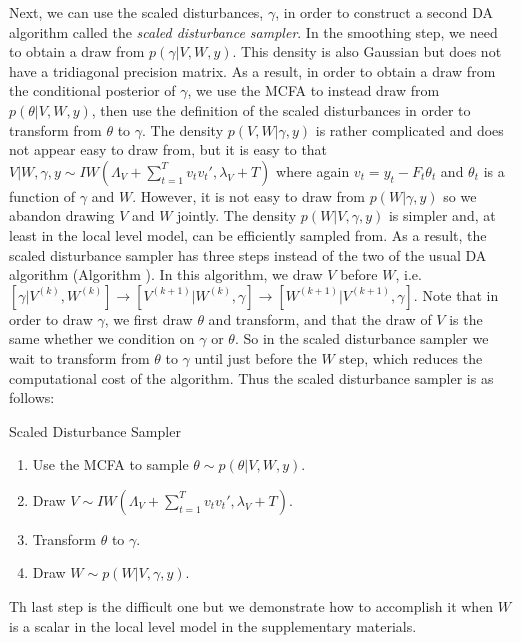 \documentclass{article}
\begin{document}
Next, we can use the scaled disturbances, $\gamma$, in order to construct a second DA algorithm called the {\it scaled disturbance sampler}. In the smoothing step, we need to obtain a draw from $p(\gamma|V,W,y)$. This density is also Gaussian but does not have a tridiagonal precision matrix. As a result, in order to obtain a draw from the conditional posterior of $\gamma$, we use the MCFA to instead draw from $p(\theta|V,W,y)$, then use the definition of the scaled disturbances in order to transform from $\theta$ to $\gamma$. The density $p(V,W|\gamma,y)$ is rather complicated and does not appear easy to draw from, but it is easy to that $V|W,\gamma,y \sim IW\left(\Lambda_V + \sum_{t=1}^Tv_tv_t',\lambda_V + T\right)$ where again $v_t = y_t - F_t\theta_t$ and $\theta_t$ is a function of $\gamma$ and $W$. However, it is not easy to draw from $p(W|\gamma,y)$ so we abandon drawing $V$ and $W$ jointly. The density $p(W|V,\gamma,y)$ is simpler and, at least in the local level model, can be efficiently sampled from. As a result, the scaled disturbance sampler has three steps instead of the two of the usual DA algorithm (Algorithm ). In this algorithm, we draw $V$ before $W$, i.e. $[\gamma|V^{(k)},W^{(k)}] \to [V^{(k+1)}|W^{(k)},\gamma] \to [W^{(k+1)}|V^{(k+1)},\gamma]$. Note that in order to draw $\gamma$, we first draw $\theta$ and transform, and that the draw of $V$ is the same whether we condition on $\gamma$ or $\theta$. So in the scaled disturbance sampler we wait to transform from $\theta$ to $\gamma$ until just before the $W$ step, which reduces the computational cost of the algorithm. Thus the scaled disturbance sampler is as follows:
\begin{alg*}[SD]Scaled Disturbance Sampler\label{alg:DLMdist}
\begin{enumerate}
\item Use the MCFA to sample $\theta \sim p(\theta|V,W,y)$.
\item Draw $V \sim IW\left(\Lambda_V + \sum_{t=1}^Tv_tv_t',\lambda_V + T\right)$.
\item Transform $\theta$ to $\gamma$.
\item Draw $W \sim p(W|V,\gamma,y)$.
\end{enumerate}
\end{alg*}\noindent
Th last step is the difficult one but we demonstrate how to accomplish it when $W$ is a scalar in the local level model in the supplementary materials.
\end{document}
